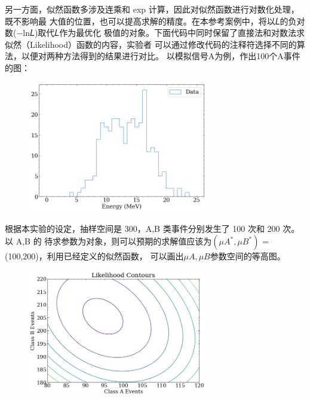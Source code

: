 \documentclass[10pt,a4paper,twoside,UTF8]{ctexart}
\begin{document}
另一方面，似然函数多涉及连乘和 exp 计算，因此对似然函数进行对数化处理，既不影响最
大值的位置，也可以提高求解的精度。在本参考案例中，将以𝐿的负对数(−ln𝐿)取代𝐿作为最优化
极值的对象。下面代码中同时保留了直接法和对数法求似然（Likelihood）函数的内容，实验者
可以通过修改代码的注释符选择不同的算法，以便对两种方法得到的结果进行对比。
以模拟信号A为例，作出100个A事件的图：
\begin{figure}[H]
	\centering
	\includegraphics[width=0.7\textwidth]{img//2.png}
	\label{fig:2}
\end{figure}

根据本实验的设定，抽样空间是 300，A,B 类事件分别发生了 100 次和 200 次。以 A,B 的
待求参数为对象，则可以预期的求解值应该为$(\mu A^{*}, \mu B^{*})$ = (100,200)，利用已经定义的似然函数，
可以画出$\mu A,\mu B$参数空间的等高图。
\begin{figure}[H]
	\centering
	\includegraphics[width=0.7\textwidth]{img//3.png}
	\label{fig:3}
\end{figure}
\end{document}
